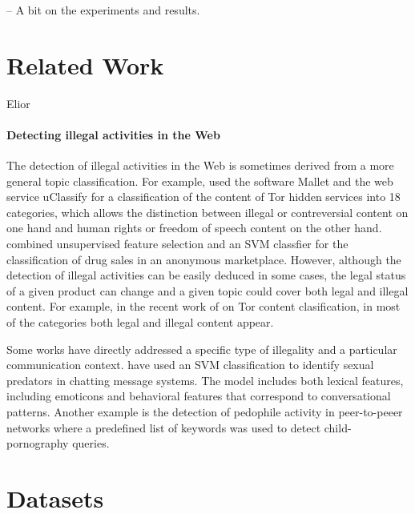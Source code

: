 \documentclass[11pt,a4paper]{article}
\begin{document}
-- A bit on the experiments and results.

\section{Related Work}

Elior

\paragraph{Detecting illegal activities in the Web}

The detection of illegal activities in the Web is sometimes derived from a more general topic classification. For example, \citet{Biryukov14} used the software Mallet \citep{McCallum02} and the web service uClassify \citep{Kagstrom13} for a classification of the content of Tor hidden services into 18 categories, which allows the distinction between illegal or contreversial content on one hand and human rights or freedom of speech content on the other hand. \citet{GraczykKinningham15} combined unsupervised feature selection and an SVM classfier for the classification of drug sales in an anonymous marketplace. However, although the detection of illegal activities can be easily deduced in some cases, the legal status of a given product can change \citep{GraczykKinningham15} and a given topic could cover both legal and illegal content. For example, in the recent work of \citet{Avarikioti18} on Tor content clasification, in most of the categories both legal and illegal content appear.

Some works have directly addressed a specific type of illegality and a particular communication context. \citet{MorrisHirst12} have used an SVM classification to identify sexual predators in chatting message systems. The model includes both lexical features, including emoticons and behavioral features that correspond to conversational patterns. Another example is the detection of pedophile activity in peer-to-peeer networks \citep{Latapy13} where a predefined list of keywords was used to detect child-pornography queries.





\section{Datasets}
\end{document}
